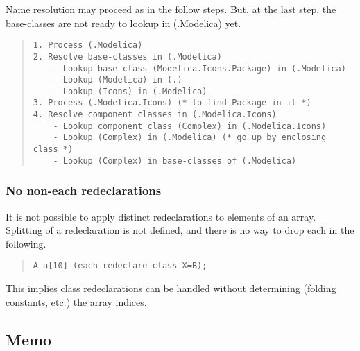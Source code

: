 \documentclass[10pt,b5paper]{article}
\begin{document}
Name resolution may proceed as in the follow steps.  But, at the last
step, the base-classes are not ready to lookup in (.Modelica) yet.
\begin{quote}
\begin{verbatim}
1. Process (.Modelica)
2. Resolve base-classes in (.Modelica)
    - Lookup base-class (Modelica.Icons.Package) in (.Modelica)
    - Lookup (Modelica) in (.)
    - Lookup (Icons) in (.Modelica)
3. Process (.Modelica.Icons) (* to find Package in it *)
4. Resolve component classes in (.Modelica.Icons)
    - Lookup component class (Complex) in (.Modelica.Icons)
    - Lookup (Complex) in (.Modelica) (* go up by enclosing class *)
    - Lookup (Complex) in base-classes of (.Modelica)
\end{verbatim}
\end{quote}

\subsubsection*{No non-each redeclarations}

It is not possible to apply distinct redeclarations to elements of an
array.  Splitting of a redeclaration is not defined, and there is no
way to drop each in the following.

\begin{quote}
\begin{lstlisting}[aboveskip=-\baselineskip]
A a[10] (each redeclare class X=B);
\end{lstlisting}
\end{quote}

This implies class redeclarations can be handled without determining
(folding constants, etc.) the array indices.


\subsection{Memo}
\end{document}

